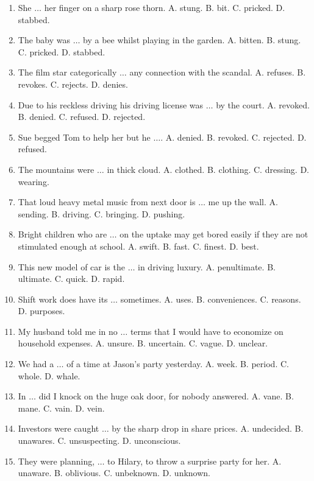 \documentclass{article}
\numberwithin{equation}{section}
\begin{document}
\begin{enumerate}[leftmargin=8mm]
	\item She $\ldots$ her finger on a sharp rose thorn. {\sf A.} stung. {\sf B.} bit. {\sf C.} pricked. {\sf D.} stabbed.
	\item The baby was $\ldots$ by a bee whilst playing in the garden. {\sf A.} bitten. {\sf B.} stung. {\sf C.} pricked. {\sf D.} stabbed.
	\item The film star categorically $\ldots$ any connection with the scandal. {\sf A.} refuses. {\sf B.} revokes. {\sf C.} rejects. {\sf D.} denies.
	\item Due to his reckless driving his driving license was $\ldots$ by the court. {\sf A.} revoked. {\sf B.} denied. {\sf C.} refused. {\sf D.} rejected.
	\item Sue begged Tom to help her but he $\ldots$. {\sf A.} denied. {\sf B.} revoked. {\sf C.} rejected. {\sf D.} refused.
	\item The mountains were $\ldots$ in thick cloud. {\sf A.} clothed. {\sf B.} clothing. {\sf C.} dressing. {\sf D.} wearing.
	\item That loud heavy metal music from next door is $\ldots$ me up the wall. {\sf A.} sending. {\sf B.} driving. {\sf C.} bringing. {\sf D.} pushing.
	\item Bright children who are $\ldots$ on the uptake may get bored easily if they are not stimulated enough at school. {\sf A.} swift. {\sf B.} fast. {\sf C.} finest. {\sf D.} best.
	\item This new model of car is the $\ldots$ in driving luxury. {\sf A.} penultimate. {\sf B.} ultimate. {\sf C.} quick. {\sf D.} rapid.
	\item Shift work does have its $\ldots$ sometimes. {\sf A.} uses. {\sf B.} conveniences. {\sf C.} reasons. {\sf D.} purposes.
	\item My husband told me in no $\ldots$ terms that I would have to economize on household expenses. {\sf A.} unsure. {\sf B.} uncertain. {\sf C.} vague. {\sf D.} unclear.
	\item We had a $\ldots$ of a time at Jason's party yesterday. {\sf A.} week. {\sf B.} period. {\sf C.} whole. {\sf D.} whale.
	\item In $\ldots$ did I knock on the huge oak door, for nobody answered. {\sf A.} vane. {\sf B.} mane. {\sf C.} vain. {\sf D.} vein.
	\item Investors were caught $\ldots$ by the sharp drop in share prices. {\sf A.} undecided. {\sf B.} unawares. {\sf C.} unsuspecting. {\sf D.} unconscious.
	\item They were planning, $\ldots$ to Hilary, to throw a surprise party for her. {\sf A.} unaware. {\sf B.} oblivious. {\sf C.} unbeknown. {\sf D.} unknown.

\end{enumerate}
\end{document}
